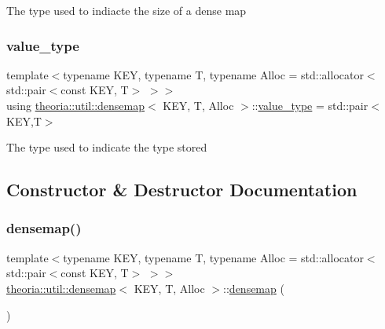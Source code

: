 The type used to indiacte the size of a dense map \mbox{\label{classtheoria_1_1util_1_1densemap_a6d2419665695def56b2abbd849f74b08}} 
\subsubsection{\texorpdfstring{value\+\_\+type}{value\_type}}
{\footnotesize\ttfamily template$<$typename K\+EY, typename T, typename Alloc = std\+::allocator$<$std\+::pair$<$const K\+E\+Y, T$>$ $>$$>$ \\
using \hyperlink{classtheoria_1_1util_1_1densemap}{theoria\+::util\+::densemap}$<$ K\+EY, T, Alloc $>$\+::\hyperlink{classtheoria_1_1util_1_1densemap_a6d2419665695def56b2abbd849f74b08}{value\+\_\+type} =  std\+::pair$<$K\+EY,T$>$}

The type used to indicate the type stored 

\subsection{Constructor \& Destructor Documentation}
\mbox{\label{classtheoria_1_1util_1_1densemap_a16acc8f341deb3ac951997def52d6bc5}} 
\subsubsection{\texorpdfstring{densemap()}{densemap()}\hspace{0.1cm}{\footnotesize\ttfamily [1/7]}}
{\footnotesize\ttfamily template$<$typename K\+EY, typename T, typename Alloc = std\+::allocator$<$std\+::pair$<$const K\+E\+Y, T$>$ $>$$>$ \\
\hyperlink{classtheoria_1_1util_1_1densemap}{theoria\+::util\+::densemap}$<$ K\+EY, T, Alloc $>$\+::\hyperlink{classtheoria_1_1util_1_1densemap}{densemap} (\begin{DoxyParamCaption}{ }\end{DoxyParamCaption})\hspace{0.3cm}{\ttfamily [inline]}}


